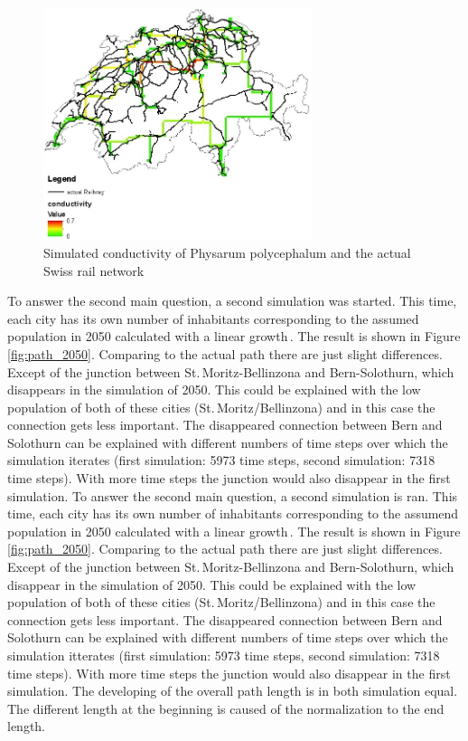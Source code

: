 \documentclass[11pt]{scrartcl}
\begin{document}
\begin{figure}[H]
	\centering
	\includegraphics[width=0.7\textwidth]{figures/conductivity_railway}
	\caption{Simulated conductivity of Physarum polycephalum and the actual Swiss rail network}
	\label{fig:conductivity}
\end{figure}
\pagebreak
To answer the second main question, a second simulation was started. This time, each city has its own number of inhabitants corresponding to the assumed population in 2050 calculated with a linear growth\,\cite{bfs}. The result is shown in Figure\,\ref{fig:path_2050}. Comparing to the actual path there are just slight differences. Except of the junction between St.\,Moritz-Bellinzona and Bern-Solothurn, which disappears in the simulation of 2050. This could be explained with the low population of both of these cities (St.\,Moritz/Bellinzona) and in this case the connection gets less important. The disappeared connection between Bern and Solothurn can be explained with different numbers of time steps over which the simulation iterates (first simulation: 5973 time steps, second simulation: 7318 time steps). With more time steps the junction would also disappear in the first simulation.
To answer the second main question, a second simulation is ran. This time, each city has its own number of inhabitants corresponding to the assumend population in 2050 calculated with a linear growth\,\cite{bfs}. The result is shown in Figure\,\ref{fig:path_2050}. Comparing to the actual path there are just slight differences. Except of the junction between St.\,Moritz-Bellinzona and Bern-Solothurn, which disappear in the simulation of 2050. This could be explained with the low population of both of these cities (St.\,Moritz/Bellinzona) and in this case the connection gets less important. The disappeared connection between Bern and Solothurn can be explained with different numbers of time steps over which the simulation itterates (first simulation: 5973 time steps, second simulation: 7318 time steps). With more time steps the junction would also disappear in the first simulation. The developing of the overall path length is in both simulation equal. The different length at the beginning is caused of the normalization to the end length.
\end{document}
